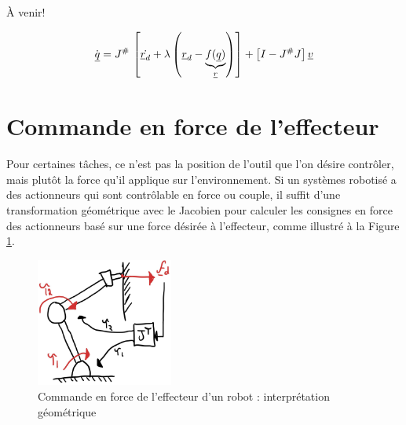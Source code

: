 À venir!

\begin{align}
\dot{\underline{q}} = J^{\#} \, \left[ \dot{\underline{r}_d} + \lambda \left( \underline{r}_d  - \underbrace{f(\underline{q})}_{\underline{r}}  \right)\right]  + \left[ I - J^{\#}J  \right] \underline{v}
\end{align}



\newpage
\section{Commande en force de l'effecteur}
\label{sec:forcecontrol}

Pour certaines tâches, ce n'est pas la position de l'outil que l'on désire contrôler, mais plutôt la force qu'il applique sur l'environnement. Si un systèmes robotisé a des actionneurs qui sont contrôlable en force ou couple, il suffit d'une transformation géométrique avec le Jacobien pour calculer les consignes en force des actionneurs basé sur une force désirée à l'effecteur, comme illustré à la Figure \ref{fig:forcecontroleffectorgeo}. 
\begin{figure}[H]
	\centering
		\includegraphics[width=0.4\textwidth]{fig/forcecontroleffectorgeo.jpg}
	\caption{Commande en force de l'effecteur d'un robot : interprétation géométrique}
	\label{fig:forcecontroleffectorgeo}
\end{figure}

